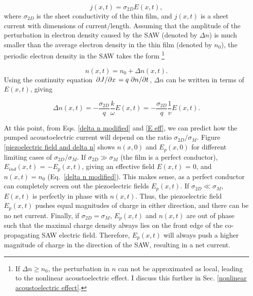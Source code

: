 \documentclass[double,12pt,1in,seploa]{beavtex}
\begin{document}
\begin{equation}
    j(x,t) = \sigma_{2D} E(x,t), \label{2D AE ohm's law}
\end{equation}
where $\sigma_{2D}$ is the sheet conductivity of the thin film, and $j(x,t)$ is a sheet current with dimensions of current/length. Assuming that the amplitude of the perturbation in electron density caused by the SAW (denoted by $\Delta n$) is much smaller than the average electron density in the thin film (denoted by $n_0$), the periodic electron density in the SAW takes the form \footnote{If $\Delta n \geq n_0$, the perturbation in $n$ can not be approximated as local, leading to the nonlinear acoustoelectric effect. I discuss this further in Sec. \ref{nonlinear acoustoelectric effect}.}


\begin{equation}
    n(x,t) = n_0 + \Delta n(x,t). 
\end{equation}
Using the continuity equation $\pdv*{J}{x} = q \pdv*{n}{t}$, $\Delta n$ can be written in terms of $E(x,t)$, giving

\begin{equation}
    \Delta n(x,t) = -\frac{\sigma_{2D}}{q} \frac{k}{\omega} E(x,t) = -\frac{\sigma_{2D}}{q} \frac{1}{v}E(x,t). \label{delta n modified}
\end{equation}

At this point, from Eqs. \ref{delta n modified} and \ref{E eff}, we can predict how the pumped acoustoelectric current will depend on the ratio $\sigma_{2D}/\sigma_M$. Figure \ref{piezoelectric field and delta n} shows $n(x,0)$ and $E_p(x,0)$ for different limiting cases of $\sigma_{2D}/\sigma_M$. If $\sigma_{2D} \gg \sigma_M$ (the film is a perfect conductor), $E_{ind}(x,t)$ = $-E_p(x,t)$, giving an effective field $E(x,t)$ = 0, and $n(x,t) = n_0$ (Eq.\ \ref{delta n modified}). This makes sense, as a perfect conductor can completely screen out the piezoelectric fields $E_p(x,t)$. If $\sigma_{2D} \ll \sigma_M$, $E(x,t)$ is perfectly in phase with $n(x,t)$. Thus, the piezoelectric field $E_p(x,t)$ pushes equal magnitudes of charge in either direction, and there can be no net current. Finally, if $\sigma_{2D} = \sigma_M$, $E_p(x,t)$ and $n(x,t)$ are out of phase such that the maximal charge density always lies on the front edge of the co-propagating SAW electric field. Therefore, $E_p(x,t)$ will always push a higher magnitude of charge in the direction of the SAW, resulting in a net current.


\end{document}

